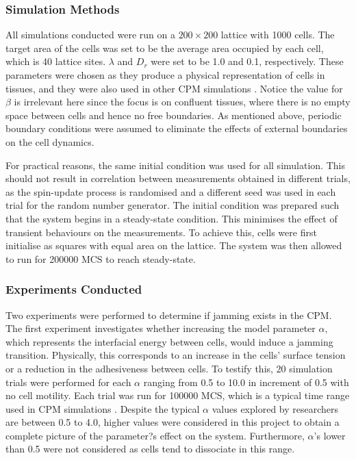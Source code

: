 \documentclass[a4paper,12pt]{article}
\begin{document}
\subsubsection{Simulation Methods}
All simulations conducted were run on a $200 \times 200$ lattice with 1000 cells. The target area of the cells was set to be the average area occupied by each cell, which is 40 lattice sites. $\lambda$ and  $D_r$ were set to be 1.0 and 0.1, respectively. These parameters were chosen as they produce a physical representation of cells in tissues, and they were also used in other CPM simulations \cite{szabo2010, graner1992}. Notice the value for $\beta$ is irrelevant here since the focus is on confluent tissues, where there is no empty space between cells and hence no free boundaries. As mentioned above, periodic boundary conditions were assumed to eliminate the effects of external boundaries on the cell dynamics. 

For practical reasons, the same initial condition was used for all simulation. This should not result in correlation between measurements obtained in different trials, as the spin-update process is randomised and a different seed was used in each trial for the random number generator. The initial condition was prepared such that the system begins in a steady-state condition. This minimises the effect of transient behaviours on the measurements. To achieve this, cells were first initialise as squares with equal area on the lattice. The system was then allowed to run for 200000 MCS to reach steady-state. 

\subsubsection{Experiments Conducted}
Two experiments were performed to determine if jamming exists in the CPM. The first experiment investigates whether increasing the model parameter $\alpha$, which represents the interfacial energy between cells, would induce a jamming transition. Physically, this corresponds to an increase in the cells' surface tension or a reduction in the adhesiveness between cells. To testify this, 20 simulation trials were performed for each $\alpha$ ranging from 0.5 to 10.0 in increment of 0.5 with no cell motility. Each trial was run for 100000 MCS, which is a typical time range used in CPM simulations \cite{kabla2012}. Despite the typical $\alpha$ values explored by researchers are between 0.5 to 4.0, higher  values were considered in this project to obtain a complete picture of the parameter?s effect on the system. Furthermore,  $\alpha$'s lower than 0.5 were not considered as cells tend to dissociate in this range. 
\end{document}
